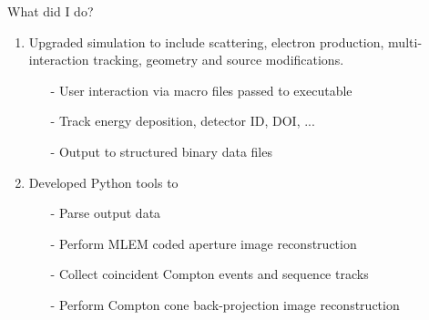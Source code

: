 \documentclass[xcolor=x11names,compress]{beamer}
\renewcommand{\(}{\begin{columns}}
\renewcommand{\)}{\end{columns}}
\newcommand{\<}[1]{\begin{column}{#1}}
\renewcommand{\>}{\end{column}}
\begin{document}
\begin{frame}{What did I do?}


\begin{enumerate}\setlength\itemsep{1.3em}
\item Upgraded simulation to include scattering, electron production, multi-interaction tracking, geometry and source modifications. 
\begin{itemize}
\small
\item[-] User interaction via macro files passed to executable
\item[-] Track energy deposition, detector ID, DOI, ...
\item[-] Output to structured binary data files
\end{itemize}
\item Developed Python tools to 
\begin{itemize}
\small
\item[-] Parse output data
\item[-] Perform MLEM coded aperture image reconstruction
\item[-] Collect coincident Compton events and sequence tracks
\item[-] Perform Compton cone back-projection image reconstruction
\end{itemize}
\end{enumerate}



\end{frame}
\end{document}
